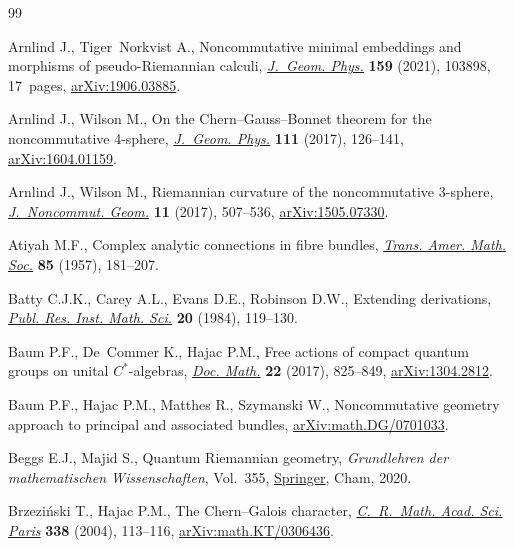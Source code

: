 \documentclass[10pt,a4paper]{amsart}
\numberwithin{equation}{section}
\begin{document}
\begin{thebibliography}{99}
\footnotesize\itemsep=0pt

Arnlind J., Tiger~Norkvist A., Noncommutative minimal embeddings and morphisms
 of pseudo-{R}iemannian calculi, \href{https://doi.org/10.1016/j.geomphys.2020.103898}{\textit{J.~Geom. Phys.}} \textbf{159} (2021),
 103898, 17~pages, \href{https://arxiv.org/abs/1906.03885}{arXiv:1906.03885}.

Arnlind J., Wilson M., On the {C}hern--{G}auss--{B}onnet theorem for the
 noncommutative 4-sphere, \href{https://doi.org/10.1016/j.geomphys.2016.10.016}{\textit{J.~Geom. Phys.}} \textbf{111} (2017),
 126--141, \href{https://arxiv.org/abs/1604.01159}{arXiv:1604.01159}.

Arnlind J., Wilson M., Riemannian curvature of the noncommutative 3-sphere,
 \href{https://doi.org/10.4171/JNCG/11-2-3}{\textit{J.~Noncommut. Geom.}} \textbf{11} (2017), 507--536,
 \href{https://arxiv.org/abs/1505.07330}{arXiv:1505.07330}.

Atiyah M.F., Complex analytic connections in fibre bundles, \href{https://doi.org/10.2307/1992969}{\textit{Trans.
 Amer. Math. Soc.}} \textbf{85} (1957), 181--207.

Batty C.J.K., Carey A.L., Evans D.E., Robinson D.W., Extending derivations,
 \href{https://doi.org/10.2977/prims/1195181832}{\textit{Publ. Res. Inst. Math. Sci.}} \textbf{20} (1984), 119--130.

Baum P.F., De~Commer K., Hajac P.M., Free actions of compact quantum groups on
 unital {$C^*$}-algebras, \href{https://doi.org/10.25537/dm.2017v22.825-849}{\textit{Doc. Math.}} \textbf{22} (2017), 825--849,
 \href{https://arxiv.org/abs/1304.2812}{arXiv:1304.2812}.

Baum P.F., Hajac P.M., Matthes R., Szymanski W., Noncommutative geometry
 approach to principal and associated bundles, \href{https://arxiv.org/abs/math.DG/0701033}{arXiv:math.DG/0701033}.

Beggs E.J., Majid S., Quantum {R}iemannian geometry, \textit{Grundlehren der
 mathematischen Wissenschaften}, Vol.~355, \href{https://doi.org/10.1007/978-3-030-30294-8}{Springer}, Cham, 2020.

Brzezi\'nski T., Hajac P.M., The {C}hern--{G}alois character,
 \href{https://doi.org/10.1016/j.crma.2003.11.009}{\textit{C.~R.~Math. Acad. Sci. Paris}} \textbf{338} (2004), 113--116,
 \href{https://arxiv.org/abs/math.KT/0306436}{arXiv:math.KT/0306436}.


\end{thebibliography}
\end{document}
